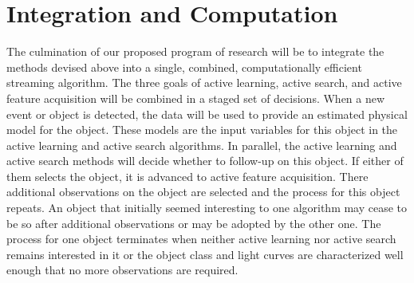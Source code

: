 \documentclass[prd,nofootbib,floatfix,11pt,tightenlines,nofootinbib]{revtex4}
\begin{document}
% 

\section{Integration and Computation}

The culmination of our proposed program of research will be to integrate
the methods devised above into a single, combined, computationally
efficient streaming algorithm.  The three goals of active learning, active
search, and active feature acquisition will be combined in a staged set of
decisions.  When a new event or object is detected, the data will be used
to provide an estimated physical model for the object.  These models are
the input variables for this object in the active learning and active
search algorithms.  In parallel, the active learning and active search
methods will decide whether to follow-up on this object.  If either of them
selects the object, it is advanced to active feature acquisition.  There
additional observations on the object are selected and the process for this
object repeats.  An object that initially seemed interesting to one
algorithm may cease to be so after additional observations or may be
adopted by the other one.  The process for one object terminates when
neither active learning nor active search remains interested in it or the
object class and light curves are characterized well enough that no more
observations are required.
\end{document}
